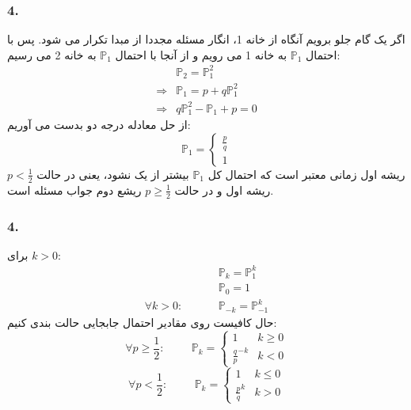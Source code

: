 \documentclass[]{article}
\begin{document}
\subsubsection{4.}
اگر یک گام جلو برویم آنگاه از خانه 1، انگار مسئله مجددا از مبدا تکرار می شود. پس با احتمال 
$\mathbb{P}_1$
به خانه 1 می رویم و از آنجا با احتمال 
$\mathbb{P}_1$
به خانه 2 می رسیم:
\begin{equation}
	\nonumber
	\begin{split}
		&\mathbb{P}_2 = \mathbb{P}_1^2\\	
		\Rightarrow &\mathbb{P}_1 = p + q \mathbb{P}_1^2\\
		\Rightarrow &q\mathbb{P}_1^2 - \mathbb{P}_1 + p = 0	
	\end{split}
\end{equation}
از حل معادله درجه دو بدست می آوریم:
\begin{equation}
	\nonumber
	\mathbb{P}_1 = 
	\begin{cases}
		 \frac{p}{q}\\
		 1
	\end{cases}
\end{equation}
ریشه اول زمانی معتبر است که احتمال کل 
$\mathbb{P}_1$
بیشتر از یک نشود، یعنی در حالت 
$p < \frac{1}{2}$
ریشه اول و در حالت 
$p \geqslant \frac{1}{2}$
 ریشع دوم جواب مسئله است.
 \subsubsection{4.}
 برای 
 $k > 0$:
 \begin{equation}
 	\nonumber
 	\begin{split}
 		& \mathbb{P}_k = \mathbb{P}_1^k\\
 		&\mathbb{P}_0 = 1\\
 		\forall k > 0 :\hspace{1cm} &\mathbb{P}_{-k} = \mathbb{P}_{-1}^k
 	\end{split}
 \end{equation}
 حال کافیست روی مقادیر احتمال جابجایی حالت بندی کنیم:
 \begin{equation}
 	\nonumber
 	\forall p \geqslant \frac{1}{2} : \hspace{1cm} \mathbb{P}_k = 
 	\begin{cases}
 		1 &\mbox{$k \geqslant 0$}\\
 		\frac{q}{p}^{-k} &\mbox{$k < 0$}
 	\end{cases}
 \end{equation}
 \begin{equation}
 	\nonumber
 	\forall p < \frac{1}{2} : \hspace{1cm} \mathbb{P}_k = 
 	\begin{cases}
 		1 &\mbox{$k \leqslant 0$}\\
 		\frac{p}{q}^{k} &\mbox{$k > 0$}
 	\end{cases}
 \end{equation}
\end{document}
